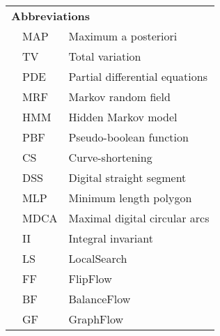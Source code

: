 {\begin{longtable}{p{0.5cm}ll}
\multicolumn{3}{l}{\textbf{Abbreviations}}\\
& MAP & Maximum a posteriori \\
& TV & Total variation \\
& PDE & Partial differential equations \\
& MRF & Markov random field\\
& HMM & Hidden Markov model\\
& PBF & Pseudo-boolean function \\
& CS & Curve-shortening \\
& DSS & Digital straight segment \\
& MLP & Minimum length polygon \\
& MDCA & Maximal digital circular arcs \\
& II & Integral invariant \\
& LS & LocalSearch \\
& FF & FlipFlow \\
& BF & BalanceFlow \\
& GF & GraphFlow


\end{longtable}
}